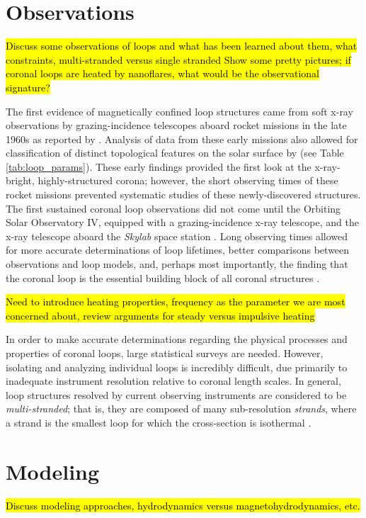 \section{Observations}
\label{sec:observations}
\hl{Discuss some observations of loops and what has been learned about them, what constraints, multi-stranded versus single stranded
Show some pretty pictures; if coronal loops are heated by nanoflares, what would be the observational signature?}
%
\par The first evidence of magnetically confined loop structures came from soft x-ray observations by grazing-incidence telescopes aboard rocket missions in the late 1960s as reported by \citet{vaiana_x-ray_1968}. Analysis of data from these early missions also allowed for classification of distinct topological features on the solar surface by \citet{vaiana_identification_1973} (see Table \ref{tab:loop_params}). These early findings provided the first look at the x-ray-bright, highly-structured corona; however, the short observing times of these rocket missions prevented systematic studies of these newly-discovered structures. The first sustained coronal loop observations did not come until the Orbiting Solar Observatory IV, equipped with a grazing-incidence x-ray telescope, and the x-ray telescope aboard the \textit{Skylab} space station \citep{krieger_results_1972,reale_coronal_2010}. Long observing times allowed for more accurate determinations of loop lifetimes, better comparisons between observations and loop models, and, perhaps most importantly, the finding that the coronal loop is the essential building block of all coronal structures \citep{rosner_dynamics_1978}. 
%
\par \hl{Need to introduce heating properties, frequency as the parameter we are most concerned about, review arguments for steady versus impulsive heating}
%
\par In order to make accurate determinations regarding the physical processes and properties of coronal loops, large statistical surveys are needed. However, isolating and analyzing individual loops is incredibly difficult, due primarily to inadequate instrument resolution relative to coronal length scales. In general, loop structures resolved by current observing instruments are considered to be \textit{multi-stranded}; that is, they are composed of many sub-resolution \textit{strands}, where a strand is the smallest loop for which the cross-section is isothermal \citep{bradshaw_diagnosing_2012}. 
%

\section{Modeling}
\label{sec:modeling}
\hl{Discuss modeling approaches, hydrodynamics versus magnetohydrodynamics, etc.}
